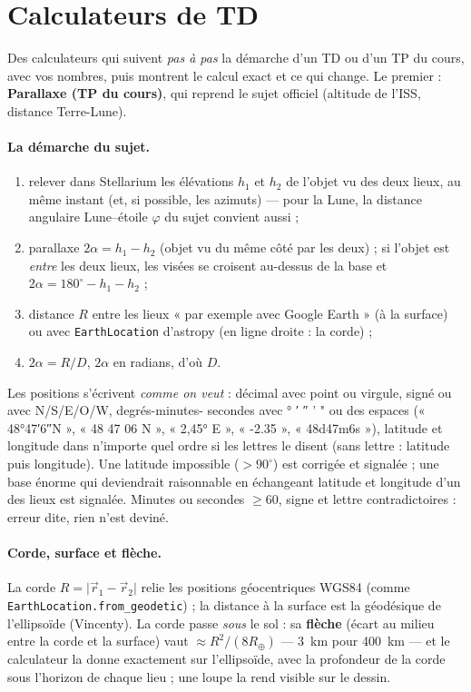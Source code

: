 \section{Calculateurs de TD}\label{sec:td}
Des calculateurs qui suivent \emph{pas à pas} la démarche d'un TD ou d'un TP du cours, avec vos nombres, puis montrent
le calcul exact et ce qui change. Le premier : \textbf{Parallaxe (TP du cours)}, qui reprend le sujet officiel
(altitude de l'ISS, distance Terre-Lune).

\paragraph{La démarche du sujet.}
\begin{enumerate}
\item relever dans Stellarium les élévations $h_1$ et $h_2$ de l'objet vu des deux lieux, au même instant (et, si
possible, les azimuts) — pour la Lune, la distance angulaire Lune–étoile $\varphi$ du sujet convient aussi ;
\item parallaxe $2\alpha = h_1 - h_2$ (objet vu du même côté par les deux) ; si l'objet est \emph{entre} les deux lieux,
les visées se croisent au-dessus de la base et $2\alpha = 180^\circ - h_1 - h_2$ ;
\item distance $R$ entre les lieux « par exemple avec Google Earth » (à la surface) ou avec \texttt{EarthLocation}
d'astropy (en ligne droite : la corde) ;
\item $2\alpha = R/D$, $2\alpha$ en radians, d'où $D$.
\end{enumerate}
Les positions s'écrivent \emph{comme on veut} : décimal avec point ou virgule, signé ou avec N/S/E/O/W, degrés-minutes-%
secondes avec ° ′ ″ ' " ou des espaces (« 48°47′6″N », « 48 47 06 N », « 2,45° E », « -2.35 », « 48d47m6s »),
latitude et longitude dans n'importe quel ordre si les lettres le disent (sans lettre : latitude puis longitude). Une
latitude impossible ($> 90^\circ$) est corrigée et signalée ; une base énorme qui deviendrait raisonnable en échangeant
latitude et longitude d'un des lieux est signalée. Minutes ou secondes $\ge 60$, signe et lettre contradictoires :
erreur dite, rien n'est deviné.

\paragraph{Corde, surface et flèche.} La corde $R = \lvert\vec r_1 - \vec r_2\rvert$ relie les positions géocentriques
WGS84 (comme \texttt{EarthLocation.from\_geodetic}) ; la distance à la surface est la géodésique de l'ellipsoïde
(Vincenty). La corde passe \emph{sous} le sol : sa \textbf{flèche} (écart au milieu entre la corde et la surface) vaut
$\approx R^2/(8R_\oplus)$ — 3~km pour 400~km — et le calculateur la donne exactement sur l'ellipsoïde, avec la
profondeur de la corde sous l'horizon de chaque lieu ; une loupe la rend visible sur le dessin.

